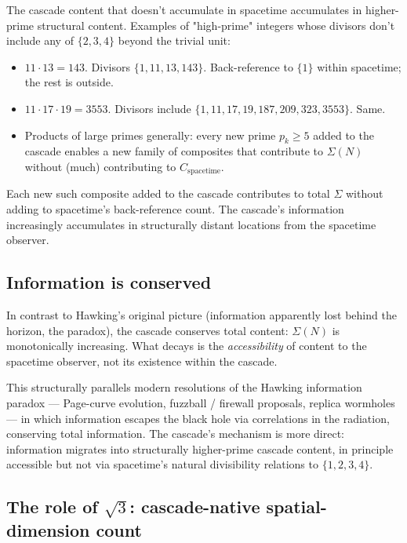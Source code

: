 \documentclass[11pt,a4paper]{article}
\begin{document}
The cascade content that doesn't accumulate in spacetime
accumulates in higher-prime structural content. Examples of
"high-prime" integers whose divisors don't include any of
$\{2, 3, 4\}$ beyond the trivial unit:
\begin{itemize}
\item $11 \cdot 13 = 143$. Divisors $\{1, 11, 13, 143\}$.
Back-reference to $\{1\}$ within spacetime; the rest is outside.
\item $11 \cdot 17 \cdot 19 = 3553$. Divisors include
$\{1, 11, 17, 19, 187, 209, 323, 3553\}$. Same.
\item Products of large primes generally: every new prime
$p_k \geq 5$ added to the cascade enables a new family of
composites that contribute to $\Sigma(N)$ without (much) contributing
to $C_{\mathrm{spacetime}}$.
\end{itemize}

Each new such composite added to the cascade contributes to total
$\Sigma$ without adding to spacetime's back-reference count. The
cascade's information increasingly accumulates in structurally
distant locations from the spacetime observer.

\subsection*{Information is conserved}

In contrast to Hawking's original picture (information apparently
lost behind the horizon, the paradox), the cascade conserves total
content: $\Sigma(N)$ is monotonically increasing. What decays is
the \emph{accessibility} of content to the spacetime observer, not
its existence within the cascade.

This structurally parallels modern resolutions of the Hawking
information paradox --- Page-curve evolution, fuzzball / firewall
proposals, replica wormholes --- in which information escapes the
black hole via correlations in the radiation, conserving total
information. The cascade's mechanism is more direct: information
migrates into structurally higher-prime cascade content, in
principle accessible but not via spacetime's natural
divisibility relations to $\{1, 2, 3, 4\}$.

\subsection*{The role of $\sqrt{3}$: cascade-native spatial-dimension count}
\end{document}
